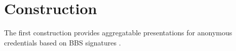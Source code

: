 \section{Construction}
The first construction provides aggregatable presentations for anonymous credentials based on BBS signatures \cite{DBLP:conf/eurocrypt/TessaroZ23a}.